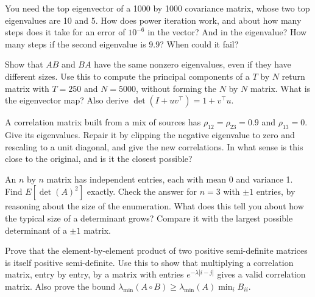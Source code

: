 \begin{question}\label{iq:iv1:linear-algebra:21}
You need the top eigenvector of a 1000 by 1000 covariance matrix, whose two top eigenvalues are 10 and 5. How does power iteration work, and about how many steps does it take for an error of $10^{-6}$ in the vector? And in the eigenvalue? How many steps if the second eigenvalue is $9.9$? When could it fail?
\end{question}

\begin{question}\label{iq:iv1:linear-algebra:22}
Show that $AB$ and $BA$ have the same nonzero eigenvalues, even if they have different sizes. Use this to compute the principal components of a $T$ by $N$ return matrix with $T = 250$ and $N = 5000$, without forming the $N$ by $N$ matrix. What is the eigenvector map? Also derive $\det(I + uv^\top) = 1 + v^\top u$.
\end{question}

\begin{question}\label{iq:iv1:linear-algebra:23}
A correlation matrix built from a mix of sources has $\rho_{12} = \rho_{23} = 0.9$ and $\rho_{13} = 0$. Give its eigenvalues. Repair it by clipping the negative eigenvalue to zero and rescaling to a unit diagonal, and give the new correlations. In what sense is this close to the original, and is it the closest possible?
\end{question}

\begin{question}\label{iq:iv1:linear-algebra:24}
An $n$ by $n$ matrix has independent entries, each with mean 0 and variance 1. Find $E[\det(A)^2]$ exactly. Check the answer for $n = 3$ with $\pm 1$ entries, by reasoning about the size of the enumeration. What does this tell you about how the typical size of a determinant grows? Compare it with the largest possible determinant of a $\pm 1$ matrix.
\end{question}

\begin{question}\label{iq:iv1:linear-algebra:25}
Prove that the element-by-element product of two positive semi-definite matrices is itself positive semi-definite. Use this to show that multiplying a correlation matrix, entry by entry, by a matrix with entries $e^{-\lambda |i - j|}$ gives a valid correlation matrix. Also prove the bound $\lambda_{\min}(A \circ B) \ge \lambda_{\min}(A) \min_i B_{ii}$.
\end{question}
